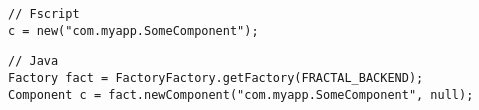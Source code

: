 \documentclass[a4paper,12pt]{report}
\begin{document}
\begin{verbatim}
// Fscript
c = new("com.myapp.SomeComponent");
\end{verbatim}

\begin{verbatim}
// Java
Factory fact = FactoryFactory.getFactory(FRACTAL_BACKEND);
Component c = fact.newComponent("com.myapp.SomeComponent", null);
\end{verbatim}



\end{document}
